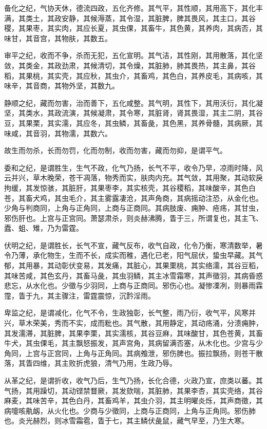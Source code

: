 \documentclass{article}%
\begin{document}
备化之纪，气协天休，德流四政，五化齐修。其气平，其性顺，其用高下，其化丰满，其类土，其政安静，其候溽蒸，其令湿，其脏脾，脾其畏风，其主口，其谷稷，其果枣，其实肉，其应长夏，其虫倮，其畜牛，其色黄，其养肉，其病否，其味甘，其音宫，其物肤，其数五。

审平之纪，收而不争，杀而无犯，五化宣明。其气洁，其性刚，其用散落，其化坚敛，其类金，其政劲肃，其候清切，其令燥，其脏肺，肺其畏热，其主鼻，其谷稻，其果桃，其实壳，其应秋，其虫介，其畜鸡，其色白，其养皮毛，其病咳，其味辛，其音商，其物外坚，其数九。

静顺之纪，藏而勿害，治而善下，五化咸整。其气明，其性下，其用沃衍，其化凝坚，其类水，其政流演，其候凝肃，其令寒，其脏肾，肾其畏湿，其主二阴，其谷豆，其果栗，其实濡，其应冬，其虫鳞，其畜彘，其色黑，其养骨髓，其病厥，其味咸，其音羽，其物濡，其数六。

故生而勿杀，长而勿罚，化而勿制，收而勿害，藏而勿抑，是谓平气。

委和之纪，是谓胜生，生气不政，化气乃扬，长气不平，收令乃早，凉雨时降，风云并兴，草木晚荣，苍干凋落，物秀而实，肤肉内充。其气敛，其用聚，其动软戾拘缓，其发惊骇，其脏肝，其果枣李，其实核壳，其谷稷稻，其味酸辛，其色白苍，其畜犬鸡，其虫毛介，其主雾露凄沧，其声角商，其病摇动注恐，从金化也。少角与判商同，上角与正角同，上商与正商同。其病肢废、痈肿、疮疡，其甘虫，邪伤肝也。上宫与正宫同。萧瑟肃杀，则炎赫沸腾，眚于三，所谓复也，其主飞、蠹、蛆、雉，乃为雷霆。

伏明之纪，是谓胜长，长气不宣，藏气反布，收气自政，化令乃衡，寒清数举，暑令乃薄，承化物生，生而不长，成实而稚，遇化已老，阳气屈伏，蛰虫早藏。其气郁，其用暴，其动彰伏变易，其发痛，其脏心，其果栗桃，其实络濡，其谷豆稻，其味苦咸，其色玄丹，其畜马彘，其虫羽鳞，其主冰雪霜寒，其声徵羽，其病昏惑悲忘，从水化也。少徵与少羽同，上商与正商同。邪伤心也。凝惨凓冽，则暴雨霖霪，眚于九，其主骤注，雷霆震惊，沉霒淫雨。

卑监之纪，是谓减化，化气不令，生政独彰，长气整，雨乃衍，收气平，风寒并兴，草木荣美，秀而不实，成而粃也。其气散，其用静定，其动疡涌，分溃痈肿，其发濡滞，其脏脾，其果李栗，其实濡核，其谷豆麻，其味酸甘，其色苍黄，其畜牛犬，其虫倮毛，其主飘怒振发，其声宫角，其病留满否塞，从木化也。少宫与少角同，上宫与正宫同，上角与正角同。其病飧泄，邪伤脾也。振拉飘扬，则苍干散落，其眚四维，其主败折虎狼，清气乃用，生政乃辱。

从革之纪，是谓折收，收气乃后，生气乃扬，长化合德，火政乃宣，庶类以蕃。其气扬，其用躁切，其动铿禁瞀厥，其发欬喘，其脏肺，其果李杏，其实壳络，其谷麻麦，其味苦辛，其色白丹，其畜鸡羊，其虫介羽，其主明曜炎烁，其声商徵，其病嚏咳鼽衂，从火化也。少商与少徵同，上商与正商同，上角与正角同。邪伤肺也。炎光赫烈，则冰雪霜雹，眚于七，其主鳞伏彘鼠，藏气早至，乃生大寒。
\end{document}
